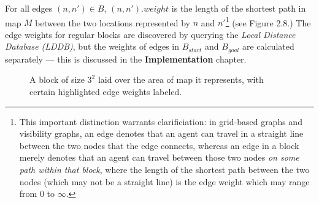 \documentclass[12pt,notitlepage]{report}
\begin{document}
\noindent For all edges $(n,n') \in B$, $(n,n').weight$ is the length of the shortest path in map $M$ between the two locations represented by $n$ and $n'$\footnote{This important distinction warrants clarificiation: in grid-based graphs and visibility graphs, an edge denotes that an agent can travel in a straight line between the two nodes that the edge connects, whereas an edge in a block merely denotes that an agent can travel between those two nodes {\em on some path within that block}, where the length of the shortest path between the two nodes (which may not be a straight line) is the edge weight which may range from $0$ to $\infty$.} (see Figure 2.8.) The edge weights for regular blocks are discovered by querying the {\em Local Distance Database (LDDB)}, but the weights of edges in $B_{start}$ and $B_{goal}$ are calculated separately --- this is discussed in the {\bfseries Implementation} chapter.\\

\begin{figure}
    \centering
    \caption[Anatomy of a block]{A block of size $3^{2}$ laid over the area of map it represents, with certain highlighted edge weights labeled.}
\end{figure}
\end{document}
